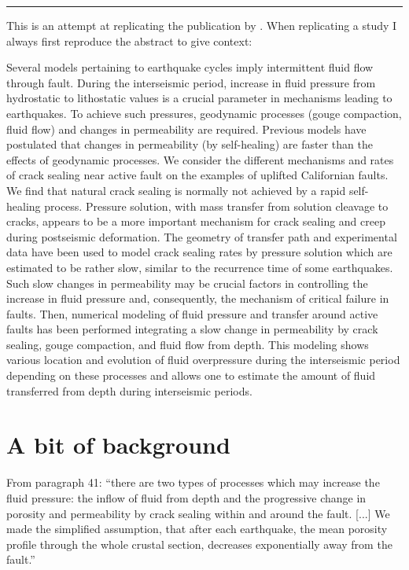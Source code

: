 \par\noindent\rule{\textwidth}{0.4pt}


This is an attempt at replicating the publication by .
When replicating a study I always first reproduce the abstract to give context:
\begin{displayquote}
{\color{darkgray}
Several models pertaining to earthquake cycles imply intermittent fluid flow through
fault. During the interseismic period, increase in fluid pressure from hydrostatic to
lithostatic values is a crucial parameter in mechanisms leading to earthquakes. To achieve
such pressures, geodynamic processes (gouge compaction, fluid flow) and changes in
permeability are required. Previous models have postulated that changes in permeability
(by self-healing) are faster than the effects of geodynamic processes. We consider the
different mechanisms and rates of crack sealing near active fault on the examples of
uplifted Californian faults. We find that natural crack sealing is normally not achieved by a
rapid self-healing process. Pressure solution, with mass transfer from solution cleavage to
cracks, appears to be a more important mechanism for crack sealing and creep during
postseismic deformation. The geometry of transfer path and experimental data have been
used to model crack sealing rates by pressure solution which are estimated to be rather
slow, similar to the recurrence time of some earthquakes. Such slow changes in
permeability may be crucial factors in controlling the increase in fluid pressure and,
consequently, the mechanism of critical failure in faults. Then, numerical modeling of
fluid pressure and transfer around active faults has been performed integrating a slow
change in permeability by crack sealing, gouge compaction, and fluid flow from depth.
This modeling shows various location and evolution of fluid overpressure during the
interseismic period depending on these processes and allows one to estimate the amount of
fluid transferred from depth during interseismic periods.
}
\end{displayquote}


\section*{A bit of background}

From paragraph 41: ``there are two types of processes
which may increase the fluid pressure: the inflow of fluid
from depth and the progressive change in porosity and
permeability by crack sealing within and around the fault.
[...] 
We made the simplified assumption, that after each earthquake, 
the mean porosity profile
through the whole crustal section, decreases exponentially
away from the fault.''

